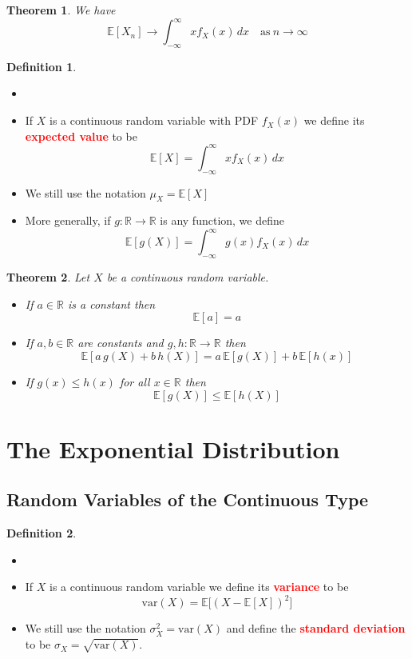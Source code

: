 \documentclass{article}
\newcommand{\R}{\mathbb{R}}
\newcommand{\E}{\mathbb{E}}
\newcommand{\var}{\text{var}}
\newcommand{\bfred}[1]{\textcolor{red}{\textbf{#1}}}
\theoremstyle{plain}
\newtheorem{thm}{Theorem}[section]
\theoremstyle{definition}
\newtheorem{defn}{Definition}[section]
\theoremstyle{remark}
\begin{document}
\begin{thm}
    We have \[\E[X_n] \rightarrow \int_{-\infty}^\infty xf_X(x)\,dx \quad \text{as} \ n \rightarrow \infty\]
\end{thm}

\begin{defn}
    \begin{itemize}
        \item []
        \item If $X$ is a continuous random variable with PDF $f_X(x)$ we define its \bfred{expected value} to be \[\E[X]=\int_{-\infty}^\infty xf_X(x)\,dx\]
        \item We still use the notation $\mu_X=\E[X]$
        \item More generally, if $g:\R\rightarrow\R$ is any function, we define \[\E[g(X)]=\int_{-\infty}^\infty g(x)f_X(x)\,dx\]
    \end{itemize}
\end{defn}

\begin{thm}
    Let $X$ be a continuous random variable.
    \begin{itemize}
        \item If $a \in \R$ is a constant then \[\E[a]=a\]
        \item If $a,b\in\R$ are constants and $g,h:\R\rightarrow\R$ then \[\E[a\,g(X)+b\,h(X)]=a\,\E[g(X)]+b\,\E[h(x)]\]
        \item If $g(x)\leq h(x)$ for all $x\in\R$ then \[\E[g(X)]\leq\E[h(X)]\]
    \end{itemize}
\end{thm}

\section{The Exponential Distribution}

\subsection{Random Variables of the Continuous Type}

\begin{defn}
    \begin{itemize}
        \item[]
        \item If $X$ is a continuous random variable we define its \bfred{variance} to be \[\var(X)=\E\Big[(X-\E[X])^2\Big]\]
        \item We still use the notation $\sigma_X^2=\var(X)$ and define the \bfred{standard deviation} to be $\sigma_X=\sqrt{\var(X)}$.
    \end{itemize}
\end{defn}
\end{document}
